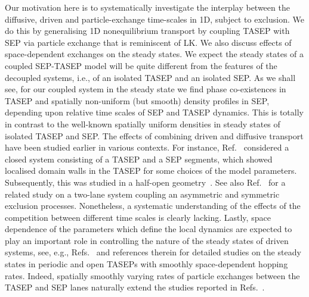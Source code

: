 \documentclass[aps,pre,twocolumn,superscriptaddress,amsmath,amssymb,longbibliography,floatfix,nofootinbib]{revtex4}
\begin{document}
Our motivation here is to systematically investigate the interplay between the diffusive, driven and particle-exchange time-scales in 1D,  subject to exclusion. We do this by generalising 1D nonequilibrium transport by coupling
TASEP with SEP via particle exchange that is reminiscent of LK. We also discuss effects of space-dependent exchanges on the steady states.
We expect the steady states of a coupled SEP-TASEP model will be quite different from the features of the decoupled systems, i.e., of an isolated TASEP and an isolated SEP.
As we shall see, for our coupled system in the steady state we find phase co-existences in 
TASEP and spatially non-uniform (but smooth) density profiles in SEP, depending upon relative time 
scales of SEP and TASEP dynamics. This is totally in contrast to the well-known
spatially uniform densities in steady states of isolated  TASEP
and SEP. {The effects of combining driven and diffusive transport have been studied earlier in various contexts. For instance, Ref.~\cite{hinsch} considered a closed system consisting of a TASEP and a SEP segments, which showed localised domain walls in the TASEP for some choices of the model parameters. Subsequently, this was studied in a half-open geometry~\cite{graf1,graf2}. See also Ref.~\cite{evans} for a related study on a two-lane system coupling an asymmetric and symmetric exclusion processes.}
Nonetheless, a systematic understanding of the effects of the competition between different time scales is clearly lacking. Lastly, space dependence of the parameters which define the local dynamics are expected to play an important role in controlling the nature of the steady states of driven systems, see, e.g., Refs.~\cite{tirtha-qkpz,sudip-jstat} and references therein for detailed studies on the steady states in periodic and  open TASEPs with smoothly space-dependent hopping rates.   Indeed, spatially smoothly varying rates of particle exchanges between the TASEP and SEP lanes naturally extend the studies reported in Refs.~\cite{tirtha-qkpz,sudip-jstat}. 
\end{document}
